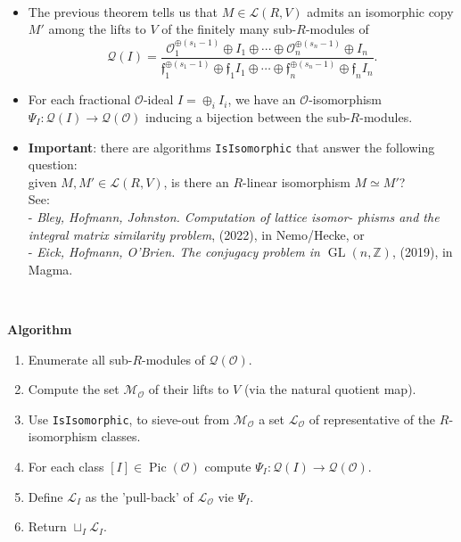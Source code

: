 \documentclass[aspectratio=169,handout,usenames,dvipsnames]{beamer}
\def\Z{\mathbb{Z}}
\DeclareMathOperator{\Pic}{Pic}
\DeclareMathOperator{\GL}{GL}
\newcommand{\cO}{{\mathcal O}}
\newcommand{\cL}{{\mathcal L}}
\newcommand{\cM}{{\mathcal M}}
\newcommand{\cQ}{{\mathcal Q}}
\newcommand{\frf}{{\mathfrak f}}
\begin{document}
\begin{frame}{}\
   \begin{itemize}
      \item The previous theorem tells us that $M\in \cL(R,V)$ admits an isomorphic copy $M'$ among the lifts to $V$ of the finitely many sub-$R$-modules of 
      \[ \cQ(I) = \dfrac{\cO_1^{\oplus(s_1-1)}\oplus I_1\oplus\cdots\oplus\cO_n^{\oplus(s_n-1)}\oplus I_n}{\frf_1^{\oplus(s_1-1)}\oplus \frf_1I_1 \oplus \cdots \oplus\frf_n^{\oplus(s_n-1)}\oplus \frf_nI_n}. \]
      \pause
      \item For each fractional $\cO$-ideal $I=\oplus_i I_i$, we have an $\cO$-isomorphism $\Psi_I:\cQ(I)\to \cQ(\cO)$ inducing a bijection between the sub-$R$-modules.
      \pause
      \item {\bf Important}: there are algorithms \texttt{IsIsomorphic} that
      answer the following question:\\
      \pause given $M,M'\in\cL(R,V)$, is there an $R$-linear isomorphism $M\simeq M'$?\\
      See:\\
      - \emph{Bley, Hofmann, Johnston. Computation of lattice isomor-
      phisms and the integral matrix similarity problem}, (2022), in Nemo/Hecke, or\\
      - \emph{Eick, Hofmann, O'Brien. The conjugacy problem in
      $\GL(n, \Z)$}, (2019), in Magma. 
   \end{itemize}
\end{frame}

\begin{frame}{}\
   \begin{block}{\bf Algorithm}
      \begin{enumerate}
         \pause \item Enumerate all sub-$R$-modules of $\cQ(\cO)$.
         \pause \item Compute the set $\cM_\cO$ of their lifts to $V$ (via the natural quotient map).
         \pause \item Use \texttt{IsIsomorphic}, to sieve-out from $\cM_\cO$ a set $\cL_\cO$ of representative of the $R$-isomorphism classes.
         \pause \item For each class $[I] \in \Pic(\cO)$ compute $\Psi_I:\cQ(I)\to \cQ(\cO)$.
         \pause \item Define $\cL_I$ as the 'pull-back' of $\cL_\cO$ vie $\Psi_I$.
         \pause \item Return $\sqcup_I \cL_I$.
      \end{enumerate}
   \end{block}
\end{frame}
\end{document}
